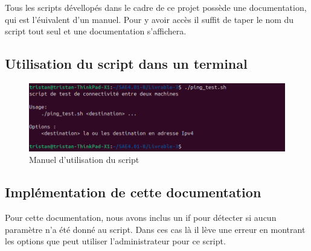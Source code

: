 \documentclass[../file_doc_script.tex]{subfiles}
\begin{document}
Tous les scripts dévellopés dans le cadre de ce projet possède une documentation,
qui est l'éuivalent d'un manuel. Pour y avoir accès il suffit de taper le nom du script
tout seul et une documentation s'affichera.

\subsection{Utilisation du script dans un terminal}

\begin{figure}[h]
    \centering
    \includegraphics[width=1\textwidth]{../Images/doc-script-terminal.png}
    \caption{Manuel d'utilisation du script}
    \label{fig:solution1}
\end{figure}

\subsection{Implémentation de cette documentation}
Pour cette documentation, nous avons inclus un if pour détecter si aucun paramètre n'a été 
donné au script. Dans ces cas là il lève une erreur en montrant les options que peut utiliser 
l'administrateur pour ce script.

\UseRawInputEncoding

\end{document}
